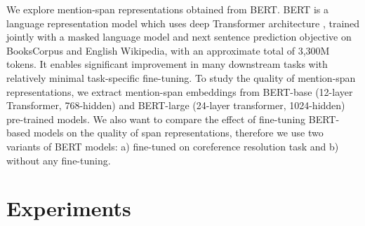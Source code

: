 \documentclass[11pt]{article}
\begin{document}
We explore mention-span representations obtained from BERT. BERT \parencite{devlin2019bert} is a language representation model which uses deep Transformer architecture \parencite{transformers}, trained jointly with a masked language model and next sentence prediction objective on BooksCorpus \parencite{bookscorpus} and English Wikipedia, with an approximate total of 3,300M tokens. It enables significant improvement in many downstream tasks with relatively minimal task-specific fine-tuning. To study the quality of mention-span representations, we extract mention-span embeddings from BERT-base (12-layer Transformer, 768-hidden) and BERT-large (24-layer transformer, 1024-hidden) pre-trained models. We also want to compare the effect of fine-tuning BERT-based models on the quality of span representations, therefore we use two variants of BERT models: a) fine-tuned on coreference resolution task and b) without any fine-tuning.



\section{Experiments}


\end{document}
